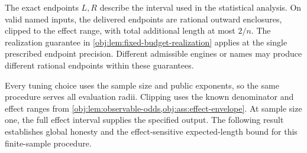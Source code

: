 \documentclass[11pt]{article}
\begin{document}
The exact endpoints \(L,R\) describe the interval used in the statistical analysis. On valid named inputs, the delivered endpoints are rational outward enclosures, clipped to the effect range, with total additional length at most \(2/n\). The realization guarantee in \cref{obj:lem:fixed-budget-realization} applies at the single prescribed endpoint precision. Different admissible engines or names may produce different rational endpoints within these guarantees.

Every tuning choice uses the sample size and public exponents, so the same procedure serves all evaluation radii. Clipping uses the known denominator and effect ranges from \cref{obj:lem:observable-odds,obj:ass:effect-envelope}. At sample size one, the full effect interval supplies the specified output. The following result establishes global honesty and the effect-sensitive expected-length bound for this finite-sample procedure.
\end{document}
